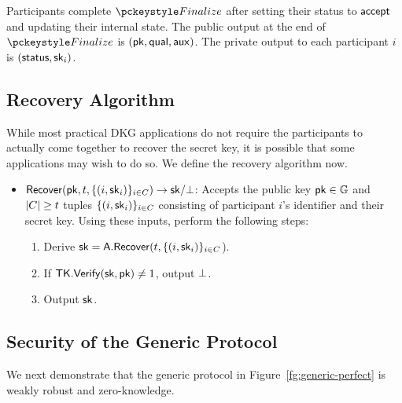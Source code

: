 Participants complete $\finalize$ after setting their status to $\mathsf{accept}$ and
updating their internal state.
The public output at the end of $\finalize$ is $(\mathsf{pk}, \mathsf{qual}, \mathsf{aux})$.
The private output to each participant $i$ is $(\mathsf{status}, \mathsf{sk}_i)$.



\subsection{Recovery Algorithm}
While most practical DKG applications do not require the participants to actually come together to recover the secret key,
it is possible that some applications may wish to do so. We define the recovery algorithm now.

\begin{itemize}
  \item $\mathsf{Recover}(\mathsf{pk}, t, \{ (i, \mathsf{sk}_i) \}_{i \in C}) \rightarrow \mathsf{sk}/\bot$:
    Accepts  the public key $\mathsf{pk} \in \mathbb{G}$
    and $\lvert C \rvert \geq t$ tuples $ \{ (i, \mathsf{sk}_i) \}_{i \in C}$ consisting of participant $i$'s identifier and their secret key.
    Using these inputs, perform the following steps:
    \begin{enumerate}
      \item Derive $\mathsf{sk} = \mathsf{A}.\mathsf{Recover}(t, \{ (i, \mathsf{sk}_i)\}_{i \in
        C}$).
      \item If $\mathsf{TK}.\mathsf{Verify}(\mathsf{sk}, \mathsf{pk}) \neq 1$, output $\bot$.
      \item Output $\mathsf{sk}$.
    \end{enumerate}
\end{itemize}

\subsection{Security of the Generic Protocol}

We next demonstrate that the generic protocol in Figure~\ref{fg:generic-perfect} is
weakly robust and zero-knowledge.






















